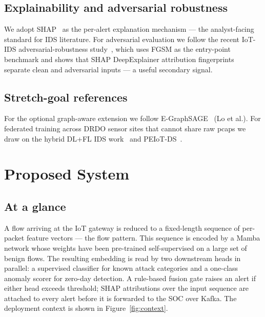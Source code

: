 \documentclass[11pt,a4paper]{article}
\begin{document}
\subsection{Explainability and adversarial robustness}
We adopt SHAP~\cite{XAI} as the per-alert explanation mechanism --- the analyst-facing standard for IDS literature. For adversarial evaluation we follow the recent IoT-IDS adversarial-robustness study~\cite{AdvIoT}, which uses FGSM as the entry-point benchmark and shows that SHAP DeepExplainer attribution fingerprints separate clean and adversarial inputs --- a useful secondary signal.

\subsection{Stretch-goal references}
For the optional graph-aware extension we follow E-GraphSAGE~\cite{EGraphSAGE} (Lo et al.). For federated training across DRDO sensor sites that cannot share raw pcaps we draw on the hybrid DL+FL IDS work~\cite{FLIDS} and PEIoT-DS~\cite{PEIoTDS}.

\section{Proposed System}

\subsection{At a glance}
A flow arriving at the IoT gateway is reduced to a fixed-length sequence of per-packet feature vectors --- the flow pattern. This sequence is encoded by a Mamba network whose weights have been pre-trained self-supervised on a large set of benign flows. The resulting embedding is read by two downstream heads in parallel: a supervised classifier for known attack categories and a one-class anomaly scorer for zero-day detection. A rule-based fusion gate raises an alert if either head exceeds threshold; SHAP attributions over the input sequence are attached to every alert before it is forwarded to the SOC over Kafka. The deployment context is shown in Figure~\ref{fig:context}.
\end{document}
